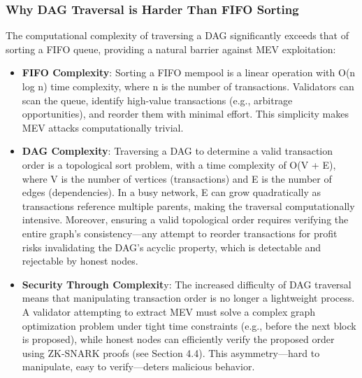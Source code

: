 \documentclass[12pt]{article}
\begin{document}
\subsubsection{Why DAG Traversal is Harder Than FIFO Sorting}
\begin{justify}

The computational complexity of traversing a DAG significantly exceeds that of sorting a FIFO queue, providing a natural barrier against MEV exploitation:
\begin{itemize}
    \item \textbf{FIFO Complexity}: Sorting a FIFO mempool is a linear operation with O(n log n) time complexity, where n is the number of transactions. Validators can scan the queue, identify high-value transactions (e.g., arbitrage opportunities), and reorder them with minimal effort. This simplicity makes MEV attacks computationally trivial.

    \item \textbf{DAG Complexity}: Traversing a DAG to determine a valid transaction order is a topological sort problem, with a time complexity of O(V + E), where V is the number of vertices (transactions) and E is the number of edges (dependencies). In a busy network, E can grow quadratically as transactions reference multiple parents, making the traversal computationally intensive. Moreover, ensuring a valid topological order requires verifying the entire graph’s consistency—any attempt to reorder transactions for profit risks invalidating the DAG’s acyclic property, which is detectable and rejectable by honest nodes.
    
    \item \textbf{Security Through Complexit}y: The increased difficulty of DAG traversal means that manipulating transaction order is no longer a lightweight process. A validator attempting to extract MEV must solve a complex graph optimization problem under tight time constraints (e.g., before the next block is proposed), while honest nodes can efficiently verify the proposed order using ZK-SNARK proofs (see Section 4.4). This asymmetry—hard to manipulate, easy to verify—deters malicious behavior.
\end{itemize}
\end{justify}
\end{document}
